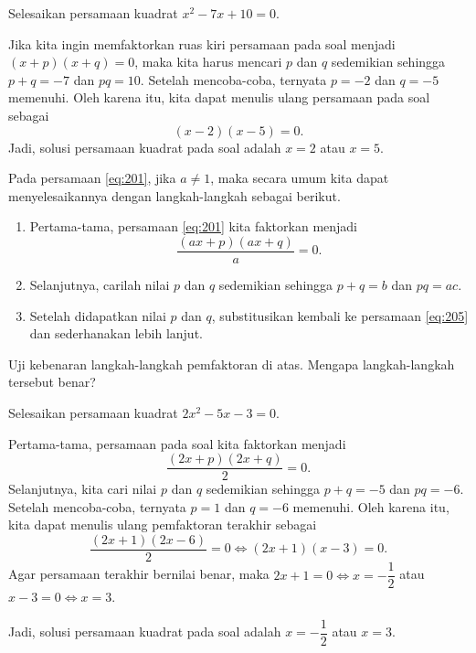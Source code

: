 		\begin{contoh}
			Selesaikan persamaan kuadrat $ x^{2} - 7x + 10 = 0 $.
		\end{contoh}
		\begin{jawab}
			Jika kita ingin memfaktorkan ruas kiri persamaan pada soal menjadi $ \left(x + p\right)\left(x + q\right) = 0 $, maka kita harus mencari $ p $ dan $ q $ sedemikian sehingga $ p + q = -7 $ dan $ pq = 10 $. Setelah mencoba-coba, ternyata $ p = -2 $ dan $ q = -5 $ memenuhi. Oleh karena itu, kita dapat menulis ulang persamaan pada soal sebagai
			\[ \left(x - 2\right)\left(x - 5\right) = 0. \]
			Jadi, solusi persamaan kuadrat pada soal adalah $ x = 2 $ atau $ x = 5 $.
		\end{jawab}
		
		\par Pada persamaan \ref{eq:201}, jika $ a \ne 1 $, maka secara umum kita dapat menyelesaikannya dengan langkah-langkah sebagai berikut.
		\begin{enumerate}
			\item Pertama-tama, persamaan \ref{eq:201} kita faktorkan menjadi
			\begin{equation} \label{eq:205}
				\frac{\left(ax + p\right)\left(ax + q\right)}{a} = 0.
			\end{equation}
			\item Selanjutnya, carilah nilai $ p $ dan $ q $ sedemikian sehingga $ p + q = b $ dan $ pq = ac $.
			\item Setelah didapatkan nilai $ p $ dan $ q $, substitusikan kembali ke persamaan \ref{eq:205} dan sederhanakan lebih lanjut.
		\end{enumerate}
		
		\begin{explbox}
			Uji kebenaran langkah-langkah pemfaktoran di atas. Mengapa langkah-langkah tersebut benar?
		\end{explbox}
		
		\begin{contoh}
			Selesaikan persamaan kuadrat $ 2x^{2} - 5x - 3 = 0 $.
		\end{contoh}
		\begin{jawab}
			Pertama-tama, persamaan pada soal kita faktorkan menjadi
			\[ \frac{\left(2x + p\right)\left(2x + q\right)}{2} = 0. \]
			Selanjutnya, kita cari nilai $ p $ dan $ q $ sedemikian sehingga $ p + q = -5 $ dan $ pq = -6 $. Setelah mencoba-coba, ternyata $ p = 1 $ dan $ q = -6 $ memenuhi. Oleh karena itu, kita dapat menulis ulang pemfaktoran terakhir sebagai
			\[ \frac{\left(2x + 1\right)\left(2x - 6\right)}{2} = 0 \iff \left(2x + 1\right)\left(x - 3\right) = 0. \]
			Agar persamaan terakhir bernilai benar, maka $ 2x + 1 = 0 \iff x = -\dfrac{1}{2} $ atau $ x - 3 = 0 \iff x = 3 $.
			\par \noindent Jadi, solusi persamaan kuadrat pada soal adalah $ x = -\dfrac{1}{2} $ atau $ x = 3 $.
		\end{jawab}
		
